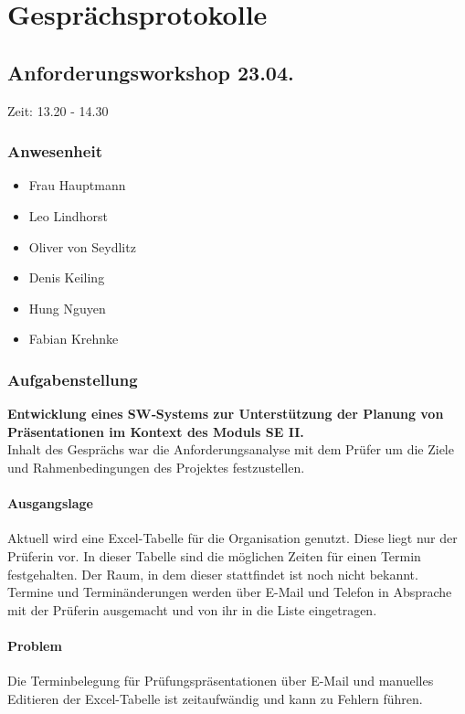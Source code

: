 \section{Gesprächsprotokolle}

\subsection{Anforderungsworkshop 23.04.} 

Zeit: 13.20 - 14.30 

\subsubsection{Anwesenheit}
\begin{itemize}
\item Frau Hauptmann
\item Leo Lindhorst
\item Oliver von Seydlitz
\item Denis Keiling
\item Hung Nguyen
\item Fabian Krehnke
\end{itemize}

\subsubsection{Aufgabenstellung}

\textbf{Entwicklung eines SW‐Systems zur Unterstützung der Planung von Präsentationen im Kontext des Moduls SE II.}
\\Inhalt des Gesprächs war die Anforderungsanalyse mit dem Prüfer um die Ziele und Rahmenbedingungen des Projektes festzustellen.

\paragraph{Ausgangslage}
Aktuell wird eine Excel-Tabelle für die Organisation genutzt. Diese liegt nur der Prüferin vor. In dieser Tabelle sind die möglichen Zeiten für einen Termin festgehalten. Der Raum, in dem dieser stattfindet ist noch nicht bekannt. Termine und Terminänderungen werden über E-Mail und Telefon in Absprache mit der Prüferin ausgemacht und von ihr in die Liste eingetragen.

\paragraph{Problem}
Die Terminbelegung für Prüfungspräsentationen über E-Mail und manuelles Editieren der Excel-Tabelle ist zeitaufwändig und kann zu Fehlern führen.


